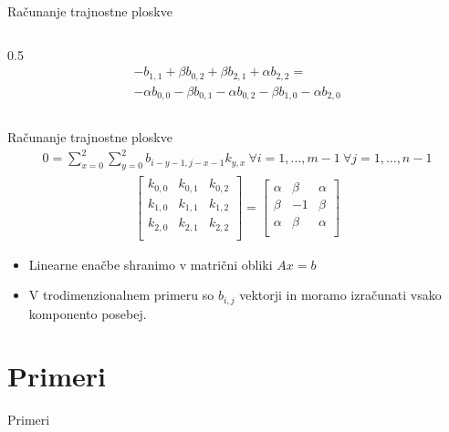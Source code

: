 \documentclass{beamer}
\begin{document}
\begin{frame}{Računanje trajnostne ploskve}
\begin{columns}
\begin{column}{0.5\textwidth}
        \begin{multline*}
            - b_{1,1} + \beta b_{0,2} + \beta b_{2,1} + \alpha b_{2,2} =  \\
            - \alpha b_{0,0} - \beta b_{0,1} - \alpha b_{0,2} - \beta b_{1,0} - \alpha b_{2,0}
        \end{multline*}
        \end{column}
    \end{columns}
    
\end{frame}

\begin{frame}{Računanje trajnostne ploskve}
    \begin{multline*}
        0 = \sum_{x=0}^2\sum_{y=0}^2 b_{i-y-1, j-x-1} k_{y, x} \ \forall i = 1, \dots, m-1\ \forall j = 1, \dots, n-1
    \end{multline*}
    \begin{align*}
        \begin{bmatrix}
            k_{0,0} & k_{0,1} & k_{0,2} \\
            k_{1,0} & k_{1,1} & k_{1,2} \\
            k_{2,0} & k_{2,1} & k_{2,2} \\
        \end{bmatrix} =
        \begin{bmatrix}
            \alpha & \beta & \alpha \\
            \beta & -1 & \beta \\
            \alpha & \beta & \alpha \\
        \end{bmatrix}
    \end{align*}

    \begin{itemize}
        \item Linearne enačbe shranimo v matrični obliki $Ax = b$
        \item V trodimenzionalnem primeru so $b_{i,j}$ vektorji in moramo izračunati vsako komponento posebej.
    \end{itemize}
\end{frame}

\section{Primeri}

\begin{frame}{Primeri}
    \begin{center}
    \resizebox*{!}{20em}{}
    \end{center}
\end{frame}
\end{document}
